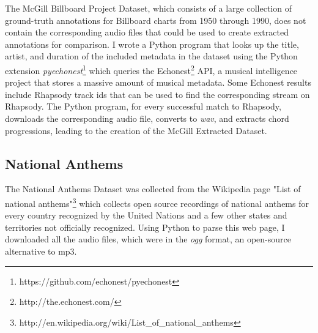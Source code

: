 The McGill Billboard Project Dataset\cite{BurgoyneEtAl_2011_AnExpeGrouSet}, which consists of a large collection of ground-truth annotations for Billboard charts from 1950 through 1990, does not contain the corresponding audio files that could be used to create extracted annotations for comparison. I wrote a Python program that looks up the title, artist, and duration of the included metadata in the dataset using the Python extension \textit{pyechonest}\footnote{https://github.com/echonest/pyechonest} which queries the Echonest\footnote{http://the.echonest.com/} API, a musical intelligence project that stores a massive amount of musical metadata. Some Echonest results include Rhapsody track ids that can be used to find the corresponding stream on Rhapsody. The Python program, for every successful match to Rhapsody, downloads the corresponding audio file, converts to \textit{wav}, and extracts chord progressions, leading to the creation of the McGill Extracted Dataset.

\subsection{National Anthems}

The National Anthems Dataset was collected from the Wikipedia page "List of national anthems"\footnote{http://en.wikipedia.org/wiki/List\_of\_national\_anthems} which collects open source recordings of national anthems for every country recognized by the United Nations and a few other states and territories not officially recognized. Using Python to parse this web page, I downloaded all the audio files, which were in the \textit{ogg} format, an open-source alternative to mp3.